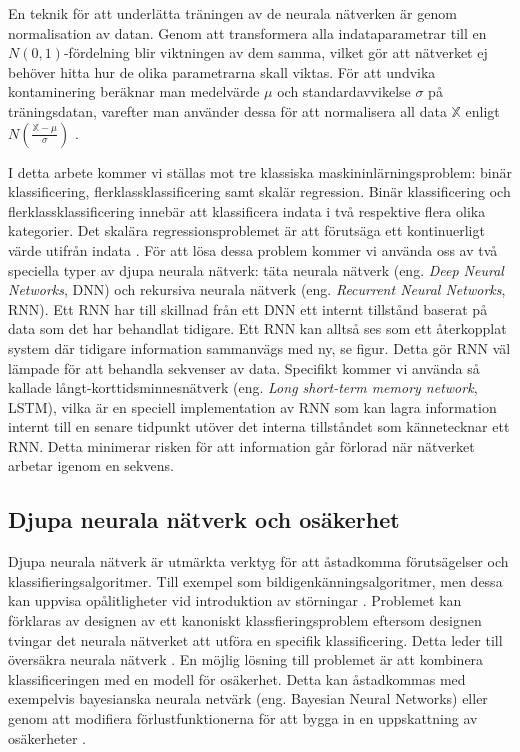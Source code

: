 En teknik för att underlätta träningen av de neurala nätverken är genom normalisation av datan. Genom att transformera alla indataparametrar till en $N(0,1)$-fördelning blir viktningen av dem samma, vilket gör att nätverket ej behöver hitta hur de olika parametrarna skall viktas. För att undvika kontaminering beräknar man medelvärde $\mu$ och standardavvikelse $\sigma$ på träningsdatan, varefter man använder dessa för att normalisera all data $\mathbb{X}$ enligt $N\left(\frac{\mathbb{X}-\mu}{\sigma}\right)$ \cite{Chollet}.

I detta arbete kommer vi ställas mot tre klassiska maskininlärningsproblem: binär klassificering, flerklassklassificering samt skalär regression. Binär klassificering och flerklassklassificering innebär att klassificera indata i två respektive flera olika kategorier. Det skalära regressionsproblemet är att förutsäga ett kontinuerligt värde utifrån indata \cite{Chollet}. För att lösa dessa problem kommer vi använda oss av två speciella typer av djupa neurala nätverk: täta neurala nätverk (eng. \emph{Deep Neural Networks}, DNN) och rekursiva neurala nätverk (eng. \emph{Recurrent Neural Networks}, RNN). Ett RNN har till skillnad från ett DNN ett internt tillstånd baserat på data som det har behandlat tidigare. Ett RNN kan alltså ses som ett återkopplat system där tidigare information sammanvägs med ny, se figur. Detta gör RNN väl lämpade för att behandla sekvenser av data. Specifikt kommer vi använda så kallade långt-korttidsminnesnätverk (eng. \emph{Long short-term memory network}, LSTM), vilka är en speciell implementation av RNN som kan lagra information internt till en senare tidpunkt utöver det interna tillståndet som kännetecknar ett RNN. Detta minimerar risken för att information går förlorad när nätverket arbetar igenom en sekvens.


\subsection{Djupa neurala nätverk och osäkerhet}
\label{NN_and_uncert}
Djupa neurala nätverk är utmärkta verktyg för att åstadkomma förutsägelser och klassifieringsalgoritmer. Till exempel som bildigenkänningsalgoritmer, men dessa kan uppvisa opålitligheter vid introduktion av störningar \cite{Elephant}. Problemet kan förklaras av designen av ett kanoniskt klassfieringsproblem eftersom designen tvingar det neurala nätverket att utföra en specifik klassificering. Detta leder till översäkra neurala nätverk \cite{Kendall-Gal}. En möjlig lösning till problemet är att kombinera klassificeringen med en modell för osäkerhet. Detta kan åstadkommas med exempelvis bayesianska neurala netvärk (eng. Bayesian Neural Networks) eller genom att modifiera förlustfunktionerna för att bygga in en uppskattning av osäkerheter \cite{Kendall-Gal}.

